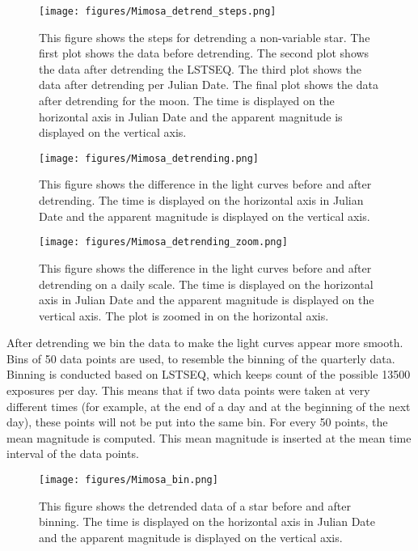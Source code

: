 \documentclass{aa}
\begin{document}
\begin{figure}
    \centering
    \texttt{[image: figures/Mimosa\_detrend\_steps.png]}
    \caption{This figure shows the steps for detrending a non-variable star. The first plot shows the data before detrending.
    The second plot shows the data after detrending the LSTSEQ. The third plot shows the data after detrending per Julian Date. The final plot shows the data after detrending for the moon. The time is displayed on the horizontal axis in Julian Date and the apparent magnitude is displayed on the vertical axis.}
    \label{Mimosa_detrend_steps}
\end{figure}
\begin{figure}
    \centering
    \texttt{[image: figures/Mimosa\_detrending.png]}
    \caption{This figure shows the difference in the light curves before and after detrending. The time is displayed on the horizontal axis in Julian Date and the apparent magnitude is displayed on the vertical axis.}
    \label{Mimosa_detrend}
\end{figure}
\begin{figure}
    \centering
    \texttt{[image: figures/Mimosa\_detrending\_zoom.png]}
    \caption{This figure shows the difference in the light curves before and after detrending on a daily scale. The time is displayed on the horizontal axis in Julian Date and the apparent magnitude is displayed on the vertical axis. The plot is zoomed in on the horizontal axis.}
    \label{Mimosa_detrend_zoom}
\end{figure}

After detrending we bin the data to make the light curves appear more smooth. Bins of 50 data points are used, to resemble the binning of the quarterly data. Binning is conducted based on LSTSEQ, which keeps count of the possible 13500 exposures per day. This means that if two data points were taken at very different times (for example, at the end of a day and at the beginning of the next day), these points will not be put into the same bin. For every 50 points, the mean magnitude is computed. This mean magnitude is inserted at the mean time interval of the data points.


\begin{figure}
    \centering
    \texttt{[image: figures/Mimosa\_bin.png]}
    \caption{This figure shows the detrended data of a star before and after binning. The time is displayed on the horizontal axis in Julian Date and the apparent magnitude is displayed on the vertical axis.}
    \label{Mimosa_bin}
\end{figure}
\end{document}
